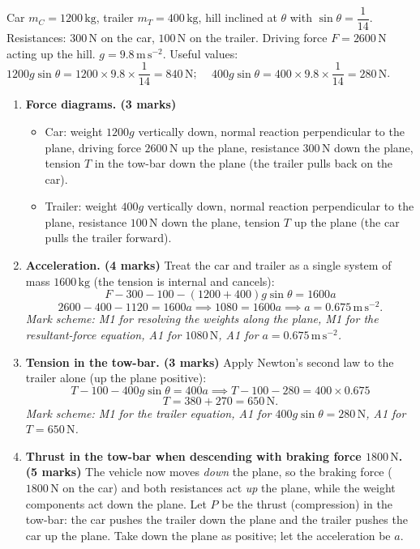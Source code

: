 \documentclass[11pt]{article}
\begin{document}
\begin{corrige}
Car $m_C = 1200\,\mathrm{kg}$, trailer $m_T = 400\,\mathrm{kg}$, hill inclined at $\theta$ with $\sin\theta = \dfrac{1}{14}$. Resistances: $300\,\mathrm{N}$ on the car, $100\,\mathrm{N}$ on the trailer. Driving force $F = 2600\,\mathrm{N}$ acting up the hill. $g = 9.8\,\mathrm{m\,s^{-2}}$.
Useful values: $1200g\sin\theta = 1200\times 9.8\times \dfrac{1}{14} = 840\,\mathrm{N}$; $\quad 400g\sin\theta = 400\times 9.8\times \dfrac{1}{14} = 280\,\mathrm{N}$.
\begin{enumerate}
\item[(a)] \textbf{Force diagrams. (3 marks)}
\begin{itemize}
\item Car: weight $1200g$ vertically down, normal reaction perpendicular to the plane, driving force $2600\,\mathrm{N}$ up the plane, resistance $300\,\mathrm{N}$ down the plane, tension $T$ in the tow-bar down the plane (the trailer pulls back on the car).
\item Trailer: weight $400g$ vertically down, normal reaction perpendicular to the plane, resistance $100\,\mathrm{N}$ down the plane, tension $T$ up the plane (the car pulls the trailer forward).
\end{itemize}
\item[(b)] \textbf{Acceleration. (4 marks)}
Treat the car and trailer as a single system of mass $1600\,\mathrm{kg}$ (the tension is internal and cancels):
\[F - 300 - 100 - (1200+400)g\sin\theta = 1600a\]
\[2600 - 400 - 1120 = 1600a \implies 1080 = 1600a \implies a = 0.675\,\mathrm{m\,s^{-2}}.\]
\textit{Mark scheme: M1 for resolving the weights along the plane, M1 for the resultant-force equation, A1 for $1080\,\mathrm{N}$, A1 for $a = 0.675\,\mathrm{m\,s^{-2}}$.}
\item[(c)] \textbf{Tension in the tow-bar. (3 marks)}
Apply Newton's second law to the trailer alone (up the plane positive):
\[T - 100 - 400g\sin\theta = 400a \implies T - 100 - 280 = 400\times 0.675\]
\[T = 380 + 270 = 650\,\mathrm{N}.\]
\textit{Mark scheme: M1 for the trailer equation, A1 for $400g\sin\theta = 280\,\mathrm{N}$, A1 for $T = 650\,\mathrm{N}$.}
\item[(d)] \textbf{Thrust in the tow-bar when descending with braking force $1800\,\mathrm{N}$. (5 marks)}
The vehicle now moves \emph{down} the plane, so the braking force ($1800\,\mathrm{N}$ on the car) and both resistances act \emph{up} the plane, while the weight components act down the plane. Let $P$ be the thrust (compression) in the tow-bar: the car pushes the trailer down the plane and the trailer pushes the car up the plane. Take down the plane as positive; let the acceleration be $a$.

\end{enumerate}
\end{corrige}
\end{document}
